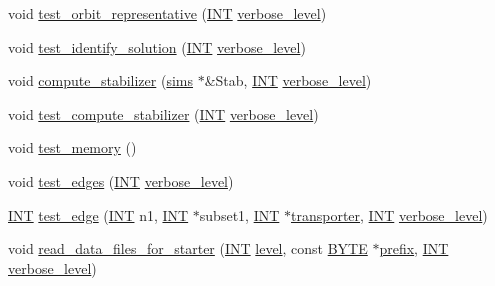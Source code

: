 \begin{DoxyCompactItemize}
\item 
void \mbox{\hyperlink{classisomorph_a5f165aa61a0d6b349da5a6117135f6c0}{test\+\_\+orbit\+\_\+representative}} (\mbox{\hyperlink{galois_8h_a09fddde158a3a20bd2dcadb609de11dc}{I\+NT}} \mbox{\hyperlink{simeon_8_c_a818073fbcc2f439e7c56952f67386122}{verbose\+\_\+level}})
\item 
void \mbox{\hyperlink{classisomorph_aa2c95f309e3283179e87bbbd83bfdc7d}{test\+\_\+identify\+\_\+solution}} (\mbox{\hyperlink{galois_8h_a09fddde158a3a20bd2dcadb609de11dc}{I\+NT}} \mbox{\hyperlink{simeon_8_c_a818073fbcc2f439e7c56952f67386122}{verbose\+\_\+level}})
\item 
void \mbox{\hyperlink{classisomorph_a572339d59deb788702ad3ede7a64c32f}{compute\+\_\+stabilizer}} (\mbox{\hyperlink{classsims}{sims}} $\ast$\&Stab, \mbox{\hyperlink{galois_8h_a09fddde158a3a20bd2dcadb609de11dc}{I\+NT}} \mbox{\hyperlink{simeon_8_c_a818073fbcc2f439e7c56952f67386122}{verbose\+\_\+level}})
\item 
void \mbox{\hyperlink{classisomorph_a72cd06f32311c44eb09dd73faa36b748}{test\+\_\+compute\+\_\+stabilizer}} (\mbox{\hyperlink{galois_8h_a09fddde158a3a20bd2dcadb609de11dc}{I\+NT}} \mbox{\hyperlink{simeon_8_c_a818073fbcc2f439e7c56952f67386122}{verbose\+\_\+level}})
\item 
void \mbox{\hyperlink{classisomorph_a27877043c77db8e85e8fa7d5c43845b0}{test\+\_\+memory}} ()
\item 
void \mbox{\hyperlink{classisomorph_ad23507927d8f7698073475d12b2a85bc}{test\+\_\+edges}} (\mbox{\hyperlink{galois_8h_a09fddde158a3a20bd2dcadb609de11dc}{I\+NT}} \mbox{\hyperlink{simeon_8_c_a818073fbcc2f439e7c56952f67386122}{verbose\+\_\+level}})
\item 
\mbox{\hyperlink{galois_8h_a09fddde158a3a20bd2dcadb609de11dc}{I\+NT}} \mbox{\hyperlink{classisomorph_a591165fa287477b480f5b7081198ba46}{test\+\_\+edge}} (\mbox{\hyperlink{galois_8h_a09fddde158a3a20bd2dcadb609de11dc}{I\+NT}} n1, \mbox{\hyperlink{galois_8h_a09fddde158a3a20bd2dcadb609de11dc}{I\+NT}} $\ast$subset1, \mbox{\hyperlink{galois_8h_a09fddde158a3a20bd2dcadb609de11dc}{I\+NT}} $\ast$\mbox{\hyperlink{classisomorph_ad835b4f9fdd2cc4f486ff10972f43758}{transporter}}, \mbox{\hyperlink{galois_8h_a09fddde158a3a20bd2dcadb609de11dc}{I\+NT}} \mbox{\hyperlink{simeon_8_c_a818073fbcc2f439e7c56952f67386122}{verbose\+\_\+level}})
\item 
void \mbox{\hyperlink{classisomorph_a388ff858a7a437e12b5a96121294f48f}{read\+\_\+data\+\_\+files\+\_\+for\+\_\+starter}} (\mbox{\hyperlink{galois_8h_a09fddde158a3a20bd2dcadb609de11dc}{I\+NT}} \mbox{\hyperlink{classisomorph_a95cd884738d351f31d8688b49c783dee}{level}}, const \mbox{\hyperlink{galois_8h_ab6cc7b4aeb6ea31aba2b3fbfc83ff5e6}{B\+Y\+TE}} $\ast$\mbox{\hyperlink{classisomorph_a8438e383d6c346392fc2fc5a0906d7eb}{prefix}}, \mbox{\hyperlink{galois_8h_a09fddde158a3a20bd2dcadb609de11dc}{I\+NT}} \mbox{\hyperlink{simeon_8_c_a818073fbcc2f439e7c56952f67386122}{verbose\+\_\+level}})

\end{DoxyCompactItemize}
